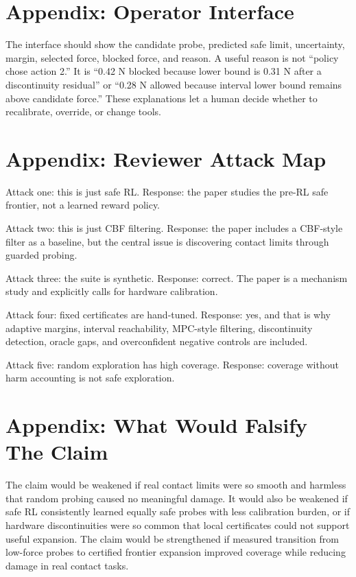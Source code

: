 \documentclass{article}
\begin{document}
\section{Appendix: Operator Interface}

The interface should show the candidate probe, predicted safe limit,
uncertainty, margin, selected force, blocked force, and reason. A useful reason
is not ``policy chose action 2.'' It is ``0.42 N blocked because lower bound is
0.31 N after a discontinuity residual'' or ``0.28 N allowed because interval
lower bound remains above candidate force.'' These explanations let a human
decide whether to recalibrate, override, or change tools.

\section{Appendix: Reviewer Attack Map}

Attack one: this is just safe RL. Response: the paper studies the pre-RL safe
frontier, not a learned reward policy.

Attack two: this is just CBF filtering. Response: the paper includes a
CBF-style filter as a baseline, but the central issue is discovering contact
limits through guarded probing.

Attack three: the suite is synthetic. Response: correct. The paper is a
mechanism study and explicitly calls for hardware calibration.

Attack four: fixed certificates are hand-tuned. Response: yes, and that is why
adaptive margins, interval reachability, MPC-style filtering, discontinuity
detection, oracle gaps, and overconfident negative controls are included.

Attack five: random exploration has high coverage. Response: coverage without
harm accounting is not safe exploration.

\section{Appendix: What Would Falsify The Claim}

The claim would be weakened if real contact limits were so smooth and harmless
that random probing caused no meaningful damage. It would also be weakened if
safe RL consistently learned equally safe probes with less calibration burden,
or if hardware discontinuities were so common that local certificates could not
support useful expansion. The claim would be strengthened if measured
transition from low-force probes to certified frontier expansion improved
coverage while reducing damage in real contact tasks.
\end{document}
